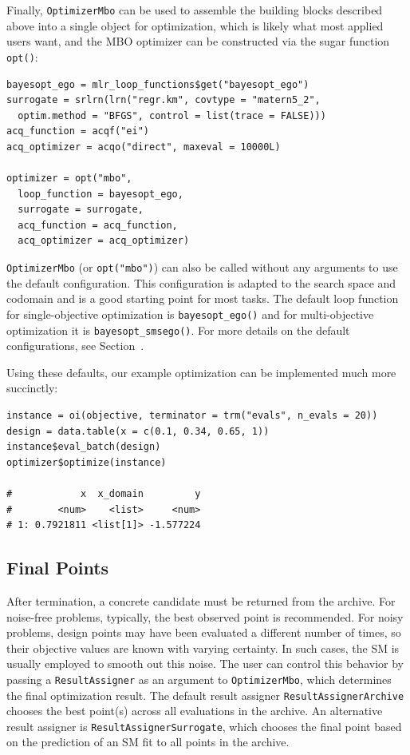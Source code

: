 \documentclass[12pt,letterpaper]{article}
\begin{document}
Finally, \texttt{OptimizerMbo} can be used to assemble the building blocks described above into a single object for optimization, which is likely what most applied users want, and the MBO optimizer can be constructed via the sugar function \texttt{opt()}:

\begin{verbatim}
bayesopt_ego = mlr_loop_functions$get("bayesopt_ego")
surrogate = srlrn(lrn("regr.km", covtype = "matern5_2",
  optim.method = "BFGS", control = list(trace = FALSE)))
acq_function = acqf("ei")
acq_optimizer = acqo("direct", maxeval = 10000L)

optimizer = opt("mbo",
  loop_function = bayesopt_ego,
  surrogate = surrogate,
  acq_function = acq_function,
  acq_optimizer = acq_optimizer)
\end{verbatim}

\texttt{OptimizerMbo} (or \texttt{opt("mbo")}) can also be called without any arguments to use the default configuration.
This configuration is adapted to the search space and codomain and is a good starting point for most tasks.
The default loop function for single-objective optimization is \texttt{bayesopt\_ego()} and for multi-objective optimization it is \texttt{bayesopt\_smsego()}.
For more details on the default configurations, see Section~.

Using these defaults, our example optimization can be implemented much more succinctly:

\begin{verbatim}
instance = oi(objective, terminator = trm("evals", n_evals = 20))
design = data.table(x = c(0.1, 0.34, 0.65, 1))
instance$eval_batch(design)
optimizer$optimize(instance)

#            x  x_domain         y
#        <num>    <list>     <num>
# 1: 0.7921811 <list[1]> -1.577224
\end{verbatim}

\subsection*{Final Points}

\label{sec:final-points}

After termination, a concrete candidate must be returned from the archive. 
For noise-free problems, typically, the best observed point is recommended. 
For noisy problems, design points may have been evaluated a different number of times, so their objective values are known with varying certainty.
In such cases, the SM is usually employed to smooth out this noise. 
The user can control this behavior by passing a \texttt{ResultAssigner} as an argument to \texttt{OptimizerMbo}, which determines the final optimization result.
The default result assigner \texttt{ResultAssignerArchive} chooses the best point(s) across all evaluations in the archive.
An alternative result assigner is \texttt{ResultAssignerSurrogate}, which chooses the final point based on the prediction of an SM fit to all points in the archive.
\end{document}
